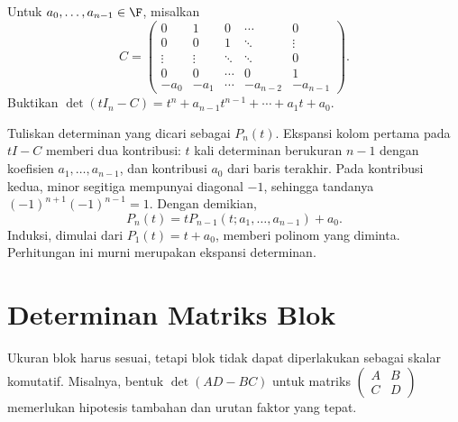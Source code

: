 \begin{exam}
      Untuk $a_0,\ldots,a_{n-1}\in\F$, misalkan
      \[
            C=\begin{pmatrix}
                  0      & 1      & 0      & \cdots   & 0        \\
                  0      & 0      & 1      & \ddots   & \vdots   \\
                  \vdots & \vdots & \ddots & \ddots   & 0        \\
                  0      & 0      & \cdots & 0        & 1        \\
                  -a_0   & -a_1   & \cdots & -a_{n-2} & -a_{n-1}
            \end{pmatrix}.
      \]
      Buktikan $\det(tI_n-C)=t^n+a_{n-1}t^{n-1}+\cdots+a_1t+a_0$.
\end{exam}
\begin{solution}
      Tuliskan determinan yang dicari sebagai $P_n(t)$.
      Ekspansi kolom pertama pada $tI-C$ memberi dua kontribusi:
      $t$ kali determinan berukuran $n-1$ dengan koefisien
      $a_1,\ldots,a_{n-1}$, dan kontribusi $a_0$ dari baris terakhir.
      Pada kontribusi kedua, minor segitiga mempunyai diagonal $-1$,
      sehingga tandanya $(-1)^{n+1}(-1)^{n-1}=1$.
      Dengan demikian,
      \[
            P_n(t)=tP_{n-1}(t;a_1,\ldots,a_{n-1})+a_0.
      \]
      Induksi, dimulai dari $P_1(t)=t+a_0$, memberi polinom yang diminta.
      Perhitungan ini murni merupakan ekspansi determinan.
\end{solution}

\section{Determinan Matriks Blok}
\label{det:blok}

Ukuran blok harus sesuai, tetapi blok tidak dapat diperlakukan sebagai
skalar komutatif. Misalnya, bentuk $\det(AD-BC)$ untuk matriks
$\left(\begin{smallmatrix}A&B\\C&D\end{smallmatrix}\right)$ memerlukan
hipotesis tambahan dan urutan faktor yang tepat.

